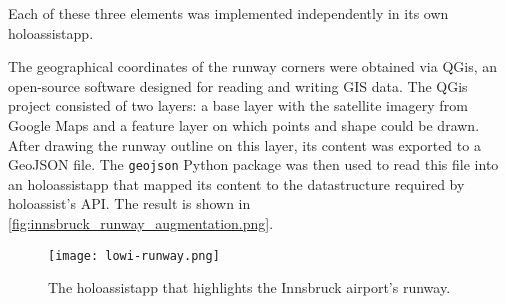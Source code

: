 Each of these three elements was implemented independently in its own \gls{holoassistapp}.

The geographical coordinates of the runway corners were obtained via QGis, an open-source software designed for reading and writing \gls{GIS} data. The QGis project consisted of two layers: a base layer with the satellite imagery from Google Maps and a feature layer on which points and shape could be drawn. After drawing the runway outline on this layer, its content was exported to a GeoJSON\cite{butler_geojson_2016} file. The \texttt{geojson} Python package\cite{noauthor_geojson_nodate} was then used to read this file into an \gls{holoassistapp} that mapped its content to the datastructure required by \gls{holoassist}'s \gls{API}. The result is shown in \autoref{fig:innsbruck_runway_augmentation.png}.

\begin{figure}
  \centering
  \texttt{[image: lowi-runway.png]}
  \caption{The \gls{holoassistapp} that highlights the Innsbruck airport's runway.}\label{fig:innsbruck_runway_augmentation.png}
\end{figure}

